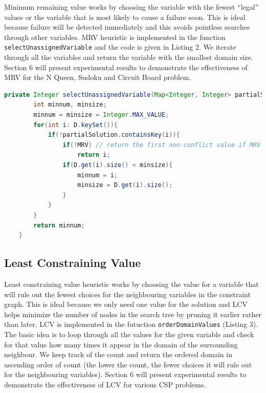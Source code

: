 \documentclass[9.5pt]{extarticle}
\begin{document}
Minimum remaining value works by choosing the variable with the fewest ``legal'' values or the variable that is most likely to cause a failure soon. This is ideal because failure will be detected immediately and this avoids pointless searches through other variables. MRV heuristic is implemented in the function \verb`selectUnassignedVariable` and the code is given in Listing 2. We iterate through all the variables and return the variable with the smallest domain size. Section 6 will present experimental results to demonstrate the effectiveness of MRV for the N Queen, Sudoku and Circuit Board problem.

 \begin{lstlisting}[language=java,caption={selectUnassignedVariable}]
	private Integer selectUnassignedVariable(Map<Integer, Integer> partialSolution) {
        int minnum, minsize;
        minnum = minsize = Integer.MAX_VALUE;
        for(int i: D.keySet()){
            if(!partialSolution.containsKey(i)){
                if(!MRV) // return the first non-conflict value if MRV heuristic is not used
                    return i;
                if(D.get(i).size() < minsize){
                    minnum = i;
                    minsize = D.get(i).size();
                }
            }
        }
        return minnum;
    }
\end{lstlisting} 

\subsection{Least Constraining Value}

Least constraining value heuristic works by choosing the value for a variable that will rule out the fewest choices for the neighbouring variables in the constraint graph. This is ideal because we only need one value for the solution and LCV helps minimize the number of nodes in the search tree by pruning it earlier rather than later. LCV is implemented in the futuction \verb`orderDomainValues` (Listing 3). The basic idea is to loop through all the values for the given variable and check for that value how many times it appear in the domain of the surrounding neighbour. We keep track of the count and return the ordered domain in ascending order of count (the lower the count, the fewer choices it will rule out for the neighbouring variables). Section 6 will present experimental results to demonstrate the effectiveness of LCV for various CSP problems.
\end{document}

